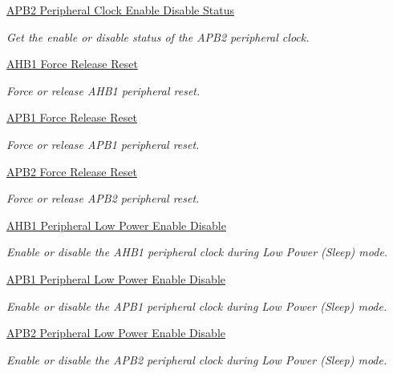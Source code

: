 \begin{DoxyCompactItemize}
\hyperlink{group___r_c_c___a_p_b2___peripheral___clock___enable___disable___status}{A\+P\+B2 Peripheral Clock Enable Disable Status}
\begin{DoxyCompactList}\small\item\em Get the enable or disable status of the A\+P\+B2 peripheral clock. \end{DoxyCompactList}\item 
\hyperlink{group___r_c_c___a_h_b1___force___release___reset}{A\+H\+B1 Force Release Reset}
\begin{DoxyCompactList}\small\item\em Force or release A\+H\+B1 peripheral reset. \end{DoxyCompactList}\item 
\hyperlink{group___r_c_c___a_p_b1___force___release___reset}{A\+P\+B1 Force Release Reset}
\begin{DoxyCompactList}\small\item\em Force or release A\+P\+B1 peripheral reset. \end{DoxyCompactList}\item 
\hyperlink{group___r_c_c___a_p_b2___force___release___reset}{A\+P\+B2 Force Release Reset}
\begin{DoxyCompactList}\small\item\em Force or release A\+P\+B2 peripheral reset. \end{DoxyCompactList}\item 
\hyperlink{group___r_c_c___a_h_b1___low_power___enable___disable}{A\+H\+B1 Peripheral Low Power Enable Disable}
\begin{DoxyCompactList}\small\item\em Enable or disable the A\+H\+B1 peripheral clock during Low Power (Sleep) mode. \end{DoxyCompactList}\item 
\hyperlink{group___r_c_c___a_p_b1___low_power___enable___disable}{A\+P\+B1 Peripheral Low Power Enable Disable}
\begin{DoxyCompactList}\small\item\em Enable or disable the A\+P\+B1 peripheral clock during Low Power (Sleep) mode. \end{DoxyCompactList}\item 
\hyperlink{group___r_c_c___a_p_b2___low_power___enable___disable}{A\+P\+B2 Peripheral Low Power Enable Disable}
\begin{DoxyCompactList}\small\item\em Enable or disable the A\+P\+B2 peripheral clock during Low Power (Sleep) mode. \end{DoxyCompactList}\item 

\end{DoxyCompactItemize}
